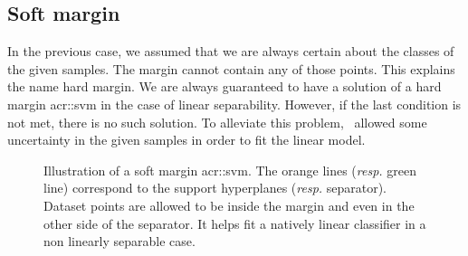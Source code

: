     \subsection{Soft margin}
        In the previous case, we assumed that we are always certain about the classes of the given samples.
        The margin cannot contain any of those points.
        This explains the name hard margin.
        We are always guaranteed to have a solution of a hard margin \gls{acr::svm} in the case of linear separability.
        However, if the last condition is not met, there is no such solution.
        To alleviate this problem,~\textcite{cortes1995support} allowed some uncertainty in the given samples in order to fit the linear model.\\

        \begin{figure}
            \centering
            
            \caption[
                Illustration of a soft margin \acrshort*{acr::svm}.
            ]{
                \label{fig::soft_margin} Illustration of a soft margin \gls{acr::svm}.
                The orange lines (\textit{resp.} green line) correspond to the support hyperplanes (\textit{resp.} separator).
                Dataset points are allowed to be inside the margin and even in the other side of the separator.
                It helps fit a natively linear classifier in a non linearly separable case.
            }
        \end{figure}

